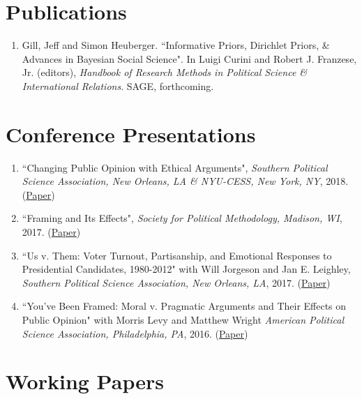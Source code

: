 \documentclass[10pt]{article}
\begin{document}
\begin{flushleft}
\section*{Publications}
\begin{enumerate}[leftmargin=!,labelindent=20pt,itemindent=-20pt]
\item[] Gill, Jeff and Simon Heuberger. ``Informative Priors, Dirichlet Priors, \& Advances in Bayesian Social Science". In Luigi Curini and Robert J. Franzese, Jr. (editors), \textit{Handbook of Research Methods in Political Science \& International Relations}. SAGE, forthcoming.

\end{enumerate}


\section*{Conference Presentations}

\begin{enumerate}[leftmargin=!,labelindent=20pt,itemindent=-20pt]
\item[] ``Changing Public Opinion with Ethical Arguments", \textit{Southern Political Science Association, New Orleans, LA \& NYU-CESS, New York, NY}, 2018. (\href{https://simonheuberger.files.wordpress.com/2018/01/h_spsa_paper1.pdf}{Paper})
\vspace{-0.27cm}
\item[] ``Framing and Its Effects", \textit{Society for Political Methodology, Madison, WI}, 2017. (\href{https://simonheuberger.files.wordpress.com/2017/06/h_polmeth_paper.pdf}{Paper})
\vspace{-0.27cm}
\item[] ``Us v. Them: Voter Turnout, Partisanship, and Emotional Responses to Presidential Candidates, 1980-2012" with Will Jorgeson and Jan E. Leighley, \textit{Southern Political Science Association, New Orleans, LA}, 2017. (\href{https://simonheuberger.files.wordpress.com/2017/02/hjl_spsa_paper.pdf}{Paper})
\vspace{-0.27cm}
\item[] ``You've Been Framed: Moral v. Pragmatic Arguments and Their Effects on Public Opinion" with Morris Levy and Matthew Wright \textit{American Political Science Association, Philadelphia, PA}, 2016. (\href{https://simonheuberger.files.wordpress.com/2017/02/hlw_apsa_paper.pdf}{Paper})
\end{enumerate}


\section*{Working Papers}


\end{flushleft}
\end{document}
